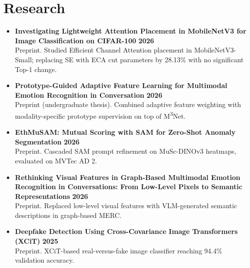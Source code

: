\documentclass{resume}
\renewenvironment{rSection}[1]{
  \Needspace{3\baselineskip}%
  \section{#1}
  \begin{list}{}{
      \setlength{\leftmargin}{0.2em}
  }
  \item[]
}{
  \end{list}
  \vspace{0pt}
}
\begin{document}
\begin{rSection}{Research}
\begin{itemize}[leftmargin=*,label=$\bullet$]
  \item \textbf{Investigating Lightweight Attention Placement in MobileNetV3 for Image Classification on CIFAR-100} \hfill \textbf{2026} \\
  Preprint. Studied Efficient Channel Attention placement in MobileNetV3-Small; replacing SE with ECA cut parameters by 28.13\% with no significant Top-1 change.
  \item \textbf{Prototype-Guided Adaptive Feature Learning for Multimodal Emotion Recognition in Conversation} \hfill \textbf{2026} \\
  Preprint (undergraduate thesis). Combined adaptive feature weighting with modality-specific prototype supervision on top of M\textsuperscript{3}Net.
  \item \textbf{EthMuSAM: Mutual Scoring with SAM for Zero-Shot Anomaly Segmentation} \hfill \textbf{2026} \\
  Preprint. Cascaded SAM prompt refinement on MuSc-DINOv3 heatmaps, evaluated on MVTec AD 2.
  \item \textbf{Rethinking Visual Features in Graph-Based Multimodal Emotion Recognition in Conversations: From Low-Level Pixels to Semantic Representations} \hfill \textbf{2026} \\
  Preprint. Replaced low-level visual features with VLM-generated semantic descriptions in graph-based MERC.
  \item \textbf{Deepfake Detection Using Cross-Covariance Image Transformers (XCiT)} \hfill \textbf{2025} \\
  Preprint. XCiT-based real-versus-fake image classifier reaching 94.4\% validation accuracy.
\end{itemize}
\end{rSection}
\end{document}
